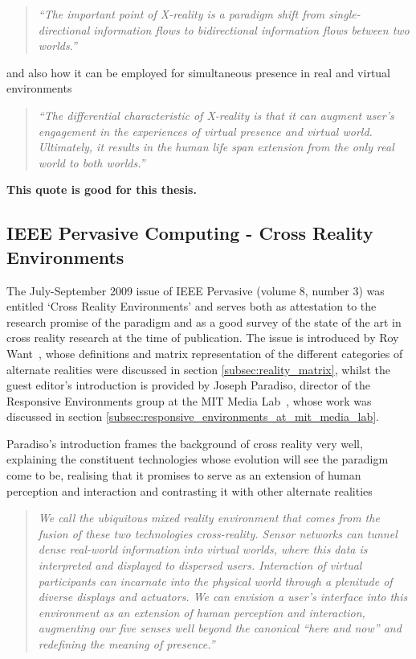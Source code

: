 \begin{quote}
\textit{``The important point of X-reality is a paradigm shift from single-directional information flows to bidirectional information flows between two worlds.''}
\end{quote}

and also how it can be employed for simultaneous presence in real and virtual environments

\begin{quote}
\textit{``The differential characteristic of X-reality is that it can augment user's engagement in the experiences of virtual presence and virtual world. Ultimately, it results in the human life span extension from the only real world to both worlds.''}
\end{quote}

\textbf{This quote is good for this thesis.}

\subsection{IEEE Pervasive Computing - Cross Reality Environments}
\label{subsec:ieee_pervasive_computing_-_cross_reality_environments}
The July-September 2009 issue of IEEE Pervasive (volume 8, number 3) was entitled `Cross Reality Environments' and serves both as attestation to the research promise of the paradigm and as a good survey of the state of the art in cross reality research at the time of publication. The issue is introduced by Roy Want~\cite{Want2009}, whose definitions and matrix representation of the different categories of alternate realities were discussed in section \ref{subsec:reality_matrix}, whilst the guest editor's introduction is provided by Joseph Paradiso, director of the Responsive Environments group at the MIT Media Lab~\cite{Paradiso2009}, whose work was discussed in section \ref{subsec:responsive_environments_at_mit_media_lab}.

Paradiso's introduction frames the background of cross reality very well, explaining the constituent technologies whose evolution will see the paradigm come to be, realising that it promises to serve as an extension of human perception and interaction and contrasting it with other alternate realities

\begin{quote}
\textit{We call the ubiquitous mixed reality environment that comes from the fusion of these two technologies cross-reality. Sensor networks can tunnel dense real-world information into virtual worlds, where this data is interpreted and displayed to dispersed users. Interaction of virtual participants can incarnate into the physical world through a plenitude of diverse displays and actuators. We can envision a user's interface into this environment as an extension of human perception and interaction, augmenting our five senses well beyond the canonical ``here and now'' and redefining the meaning of presence.''}
\end{quote}

